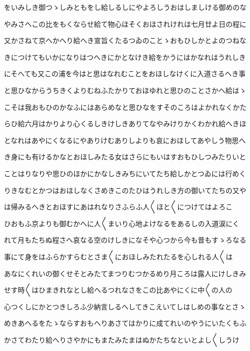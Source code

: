 \documentclass[a4paper,11pt,landscape]{ltjtarticle}
\begin{document}
\par\medskip
をいみしき御つゝしみともをし給しるしにやよろしうおはしましける御めのな
\par\medskip
やみさへこの比をもくならせ給て物心ほそくおほされけれは七月廿よ日の程に
\par\medskip
又かさねて京へかへり給へき宣旨くたるつゐのことゝおもひしかとよのつねな
\par\medskip
きにつけてもいかになりはつへきにかとなけき給をかうにはかなれはうれしき
\par\medskip
にそへても又この浦を今はと思はなれむことをおほしなけくに入道さるへき事
\par\medskip
と思ひなからうちきくよりむねふたかりておほゆれと思ひのことさかへ給はゝ
\par\medskip
こそは我おもひのかなふにはあらめなと思ひなをすそのころはよかれなくかた
\par\medskip
らひ給六月はかりより心くるしきけしきありてなやみけりかくわかれ給へきほ
\par\medskip
となれはあやにくなるにやありけむありしよりも哀におほしてあやしう物思へ
\par\medskip
き身にも有けるかなとおほしみたる女はさらにもいはすおもひしつみたりいと
\par\medskip
ことはりなりや思ひのほかにかなしきみちにいてたち給しかとつゐには行めく
\par\medskip
りきなむとかつはおほしなくさめきこのたひはうれしき方の御いてたちの又や
\par\medskip
は帰みるへきとおほすにあはれなりさふらふ人〱ほと〱につけてはよろこ
\par\medskip
ひおもふ京よりも御むかへに人〱まいり心地よけなるをあるしの入道涙にく
\par\medskip
れて月もたちぬ程さへ哀なる空のけしきになそや心つから今も昔もすゝろなる
\par\medskip
事にて身をはふらかすらむとさま〱におほしみたれたるを心しれる人〱は
\par\medskip
あなにくれいの御くせそとみたてまつりむつかるめり月ころは露人にけしきみ
\par\medskip
せす時〱はひまきれなとし給へるつれなさをこの比あやにくに中〱の人の
\par\medskip
心つくしにかとつきしろふ少納言しるへしてきこえいてしはしめの事なとさゝ
\par\medskip
めきあへるをたゝならすおもへりあさてはかりに成てれいのやうにいたくもふ
\par\medskip
かさてわたり給へりさやかにもまたみたまはぬかたちなといとよし〱しうけ
\par\medskip
\end{document}
